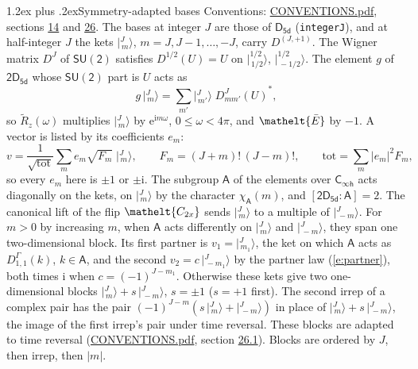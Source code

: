 \documentclass[10pt,a4paper]{article}
\makeatletter
\renewcommand\section{\@startsection{section}{1}{\z@}{-3ex plus -1ex minus -.2ex}%
  {1.2ex plus .2ex}{\normalfont\large\sffamily\bfseries\color{parttitle}}}
\numberwithin{equation}{section}
\newcommand{\eltfont}[1]{{\let\sigma\eltsigma\mathelt{#1}}}
\newcommand{\grp}[1]{\mathsf{#1}}
\newcommand{\elt}[1]{\eltfont{#1}}
\newcommand{\grpindex}[2]{[#1 : #2]}
\newcommand{\iunit}{\mathrm{i}}
\newcommand{\expe}{\mathrm{e}}
\newcommand{\irrJp}[2]{D^{(#1,#2)}}
\newcommand{\repD}[1]{D^{#1}}
\newcommand{\wignerD}[1]{D^{#1}}
\newcommand{\chiA}{\chi_{\grp{A}}}
\newcommand{\conj}[1]{{#1}^{*}}
\newcommand{\jm}[2]{\bigl\lvert{}^{#1}_{\,#2}\bigr\rangle}
\newcommand{\barred}[1]{\bar{#1}}
\newcommand{\lift}[1]{\tilde{#1}}
\makeatother
\begin{document}
\section{Symmetry-adapted bases}\label{s:bases}
Conventions: \href{../../CONVENTIONS.pdf}{CONVENTIONS.pdf}, sections \href{../../../rotation/CONVENTIONS.pdf\#conv.14}{14} and \href{../../CONVENTIONS.pdf\#conv.26}{26}.
\leavevmode\label{n:index.m}\label{n:vector.ket}The bases at integer $J$ are those of \href{../../../rotation/data/pdf/D5d.pdf}{$\grp{D_{5d}}$} (\texttt{integerJ}), and at half-integer $J$ the kets $\jm{J}{m}$, $m = J, J-1, \dots, -J$, carry $\irrJp{J}{+1}$. \label{n:matrix.wigner}The Wigner matrix $\wignerD{J}$ of $\grp{SU(2)}$ satisfies $\wignerD{1/2}(U) = U$ on $\jm{1/2}{1/2}$, $\jm{1/2}{-1/2}$. The element $g$ of $\grp{2D_{5d}}$ whose $\grp{SU(2)}$ part is $U$ acts as
\begin{equation}\label{e:action}g\,\jm{J}{m} = \sum_{m'} \jm{J}{m'}\; \conj{\wignerD{J}_{m m'}(U)},\end{equation}
so $\lift{R}_{z}(\omega)$ multiplies $\jm{J}{m}$ by $\expe^{\iunit m\omega}$, $0 \le \omega < 4\pi$, and $\elt{\barred{E}}$ by $-1$. \label{n:index.ketcoefficient}\label{n:vector.basis.symmetry}\label{n:index.ketweight}\label{n:index.total}A vector is listed by its coefficients $e_m$:
\begin{equation}\label{e:ket}v = \frac{1}{\sqrt{\mathrm{tot}}}\sum_m e_m\sqrt{F_m}\;\jm{J}{m},\qquad F_m = (J+m)!\,(J-m)!,\qquad \mathrm{tot} = \sum_m |e_m|^2F_m,\end{equation}
so every $e_m$ here is $\pm 1$ or $\pm\iunit$.
\leavevmode\label{n:group.A}\label{n:function.character.abelian}The subgroup $\grp{A}$ of the elements over $\grp{C_{\infty h}}$ acts diagonally on the kets, on $\jm{J}{m}$ by the character $\chiA(m)$, and $\grpindex{\grp{2D_{5d}}}{\grp{A}} = 2$. The canonical lift of the flip $\elt{C_{2x}}$ sends $\jm{J}{m}$ to a multiple of $\jm{J}{-m}$. For $m > 0$ by increasing $m$, when $\grp{A}$ acts differently on $\jm{J}{m}$ and $\jm{J}{-m}$, they span one two-dimensional block. \label{n:index.partner.sign}Its first partner is $v_1 = \jm{J}{m_1}$, the ket on which $\grp{A}$ acts as $\repD{\Gamma}_{1,1}(k)$, $k \in \grp{A}$, and the second $v_2 = c\,\jm{J}{-m_1}$ by the partner law (\ref{e:partner}), both times $\iunit$ when $c = (-1)^{J-m_1}$. \label{n:index.pair.sign}Otherwise these kets give two one-dimensional blocks $\jm{J}{m} + s\,\jm{J}{-m}$, $s = \pm 1$ ($s = +1$ first). The second irrep of a complex pair has the pair $(-1)^{J-m}(s\,\jm{J}{m} + \jm{J}{-m})$ in place of $\jm{J}{m} + s\,\jm{J}{-m}$, the image of the first irrep's pair under time reversal. These blocks are adapted to time reversal (\href{../../CONVENTIONS.pdf}{CONVENTIONS.pdf}, section \href{../../CONVENTIONS.pdf\#conv.26.1}{26.1}). Blocks are ordered by $J$, then irrep, then $|m|$.
\end{document}
